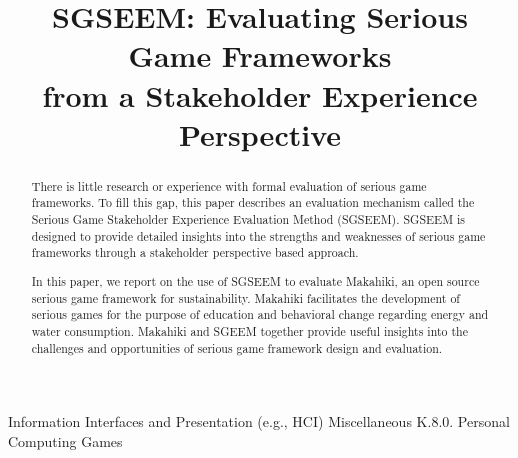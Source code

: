 \documentclass{sigchi}
\begin{document}
\title{SGSEEM: Evaluating Serious Game Frameworks\\ from a Stakeholder Experience Perspective}


\maketitle

\begin{abstract}
  There is little research or experience with formal evaluation of serious game
  frameworks. To fill this gap, this paper describes an evaluation mechanism called the
  Serious Game Stakeholder Experience Evaluation Method (SGSEEM). SGSEEM is designed to
  provide detailed insights into the strengths and weaknesses of serious game frameworks
  through a stakeholder perspective based approach.

  In this paper, we report on the use of SGSEEM to evaluate
  Makahiki, an open source serious game framework for sustainability.  Makahiki 
  facilitates the development of serious games for the purpose of education and
  behavioral change regarding energy and water consumption. Makahiki and SGEEM together
 provide useful insights into the challenges and opportunities of serious game framework design and evaluation.
\end{abstract}


 {Information Interfaces and Presentation (e.g., HCI)} {Miscellaneous} {K.8.0.} {Personal Computing} {Games}

\end{document}
